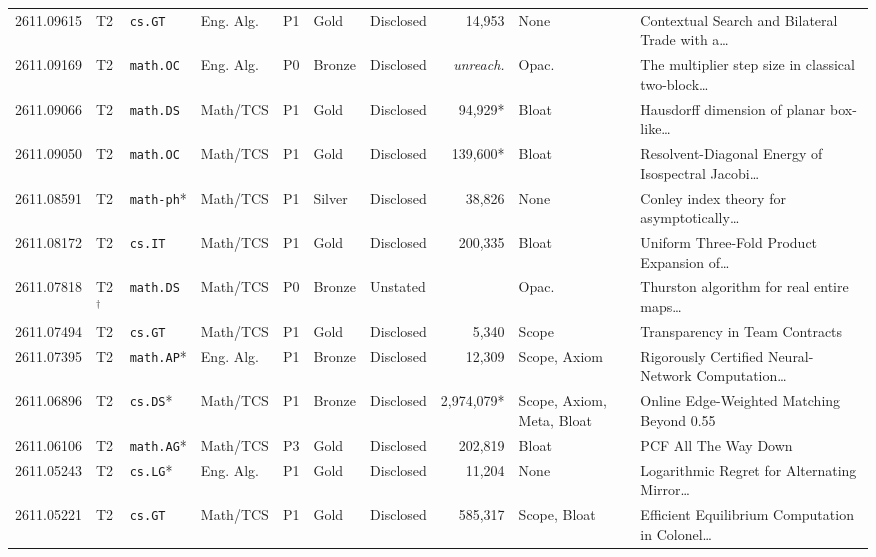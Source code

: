 \documentclass[11pt,letterpaper]{article}
\begin{document}
\begin{longtable}{lllllllrl>{\raggedright\arraybackslash}p{4.05cm}}
2611.09615 & T2 & \texttt{cs.GT} & Eng. Alg. & P1 & Gold & Disclosed & 14,953 & None & Contextual Search and Bilateral Trade with a\dots~\cite{arxiv2611_09615} \\
2611.09169 & T2 & \texttt{math.OC} & Eng. Alg. & P0 & Bronze & Disclosed & \emph{unreach.} & Opac. & The multiplier step size in classical two-block\dots~\cite{arxiv2611_09169} \\
2611.09066 & T2 & \texttt{math.DS} & Math/TCS & P1 & Gold & Disclosed & 94,929* & Bloat & Hausdorff dimension of planar box-like\dots~\cite{arxiv2611_09066} \\
2611.09050 & T2 & \texttt{math.OC} & Math/TCS & P1 & Gold & Disclosed & 139,600* & Bloat & Resolvent-Diagonal Energy of Isospectral Jacobi\dots~\cite{arxiv2611_09050} \\
2611.08591 & T2 & \texttt{math-ph}* & Math/TCS & P1 & Silver & Disclosed & 38,826 & None & Conley index theory for asymptotically\dots~\cite{arxiv2611_08591} \\
2611.08172 & T2 & \texttt{cs.IT} & Math/TCS & P1 & Gold & Disclosed & 200,335 & Bloat & Uniform Three-Fold Product Expansion of\dots~\cite{arxiv2611_08172} \\
2611.07818 & T2$^\dagger$ & \texttt{math.DS} & Math/TCS & P0 & Bronze & Unstated & \textemdash{} & Opac. & Thurston algorithm for real entire maps\dots~\cite{arxiv2611_07818} \\
2611.07494 & T2 & \texttt{cs.GT} & Math/TCS & P1 & Gold & Disclosed & 5,340 & Scope & Transparency in Team Contracts~\cite{arxiv2611_07494} \\
2611.07395 & T2 & \texttt{math.AP}* & Eng. Alg. & P1 & Bronze & Disclosed & 12,309 & Scope, Axiom & Rigorously Certified Neural-Network Computation\dots~\cite{arxiv2611_07395} \\
2611.06896 & T2 & \texttt{cs.DS}* & Math/TCS & P1 & Bronze & Disclosed & 2,974,079* & Scope, Axiom, Meta, Bloat & Online Edge-Weighted Matching Beyond 0.55~\cite{arxiv2611_06896} \\
2611.06106 & T2 & \texttt{math.AG}* & Math/TCS & P3 & Gold & Disclosed & 202,819 & Bloat & PCF All The Way Down~\cite{arxiv2611_06106} \\
2611.05243 & T2 & \texttt{cs.LG}* & Eng. Alg. & P1 & Gold & Disclosed & 11,204 & None & Logarithmic Regret for Alternating Mirror\dots~\cite{arxiv2611_05243} \\
2611.05221 & T2 & \texttt{cs.GT} & Math/TCS & P1 & Gold & Disclosed & 585,317 & Scope, Bloat & Efficient Equilibrium Computation in Colonel\dots~\cite{arxiv2611_05221} \\

\end{longtable}
\end{document}
